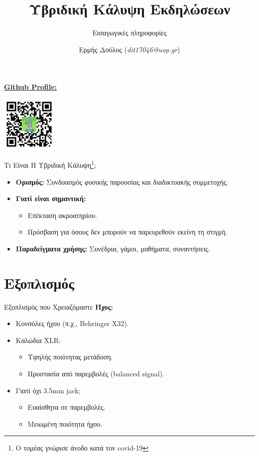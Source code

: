 \documentclass{beamer}
\title{Υβριδική Κάλυψη Εκδηλώσεων}
\subtitle{Εισαγωγικές πληροφορίες}
\author{Ερμής Δούλος (\textit{dit17046@uop.gr})}
\begin{document}
\begin{frame}
  \titlepage
    \begin{center}
      \href{https://github.com/doblador42}{\textbf{Github Profile:}}

      \includegraphics[width=0.2\textwidth]{images/qrcode.png}
  \end{center}
\end{frame}


\begin{frame}{Τι Είναι Η Υβριδική Κάλυψη\footnote{Ο τομέας γνώρισε άνοδο κατά τον covid-19};}
  \begin{itemize}
  \item \textbf{Ορισμός:} Συνδυασμός φυσικής παρουσίας και διαδικτυακής συμμετοχής.
  \item \textbf{Γιατί είναι σημαντική:}
    \begin{itemize}
    \item Επέκταση ακροατηρίου.
    \item Πρόσβαση για όσους δεν μπορούν να παρευρεθούν εκείνη τη στιγμή.
    \end{itemize}
  \item \textbf{Παραδείγματα χρήσης:} Συνέδρια, γάμοι, μαθήματα, συναντήσεις.
  \end{itemize}
\end{frame}

\section{Εξοπλισμός}
\begin{frame}{Εξοπλισμός που Χρειαζόμαστε}
  \textbf{Ήχος:}
  \begin{itemize}
  \item Κονσόλες ήχου (π.χ., Behringer X32).
  \item Καλώδια XLR:
    \begin{itemize}
    \item Υψηλής ποιότητας μετάδοση.
    \item Προστασία από παρεμβολές (balanced signal).
    \end{itemize}
  \item Γιατί όχι 3.5mm jack;
    \begin{itemize}
    \item Ευαίσθητα σε παρεμβολές.
    \item Μειωμένη ποιότητα ήχου.
    \end{itemize}
  \end{itemize}
\end{frame}
\end{document}
